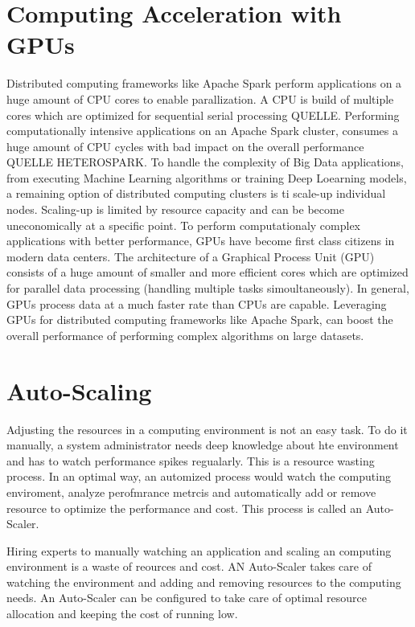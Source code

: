 \section{Computing Acceleration with GPUs}
Distributed computing frameworks like Apache Spark perform applications on a huge amount of CPU cores to enable parallization. A CPU is build of multiple cores which are optimized for sequential serial processing QUELLE. Performing computationally intensive applications on an Apache Spark cluster, consumes a huge amount of CPU cycles with bad impact on the overall performance QUELLE HETEROSPARK.
To handle the complexity of Big Data applications, from executing Machine Learning algorithms or training Deep Loearning models, a remaining option of distributed computing clusters is ti scale-up individual nodes. Scaling-up is limited by resource capacity and can be become uneconomically at a specific point.
To perform computationaly complex applications with better performance, GPUs have become first class citizens in modern data centers. The architecture of a Graphical Process Unit (GPU) consists of a huge amount of smaller and more efficient cores which are optimized for parallel data processing (handling multiple tasks simoultaneously). In general, GPUs process data at a much faster rate than CPUs are capable.
Leveraging GPUs for distributed computing frameworks like Apache Spark, can boost the overall performance of performing complex algorithms on large datasets.


\section{Auto-Scaling}
Adjusting the resources in a computing environment is not an easy task. To do it manually, a system administrator needs deep knowledge about hte environment and has to watch performance spikes regualarly. This is a resource wasting process. In an optimal way, an automized process would watch the computing enviroment, analyze perofmrance metrcis and automatically add or remove resource to optimize the performance and cost. This process is called an Auto-Scaler.


Hiring experts to manually watching an application and scaling an computing environment is a waste of reources and cost.
AN Auto-Scaler takes care of watching the environment and adding and removing resources to the computing needs. An Auto-Scaler can be configured to take care of optimal resource allocation and keeping the cost of running low.


